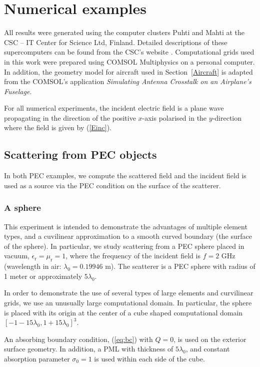 \documentclass[a4paper,12pt]{article}
\newcommand{\epsr}{\epsilon_{\mathrm{r}}}
\newcommand{\mur}{\mu_{\mathrm{r}}}
\begin{document}
\section{Numerical examples}\label{sec:NE}

All results were generated using the computer clusters Puhti and Mahti at the CSC – IT Center for Science Ltd, Finland. Detailed descriptions of these supercomputers can be found from the CSC's website \cite{CSC}. Computational grids used in this work were prepared using COMSOL Multiphysics on a personal computer. In addition, the geometry model for aircraft used in Section~\ref{Aircraft} is adapted from the COMSOL's application {\it Simulating Antenna Crosstalk on an Airplane's Fuselage}.

For all numerical experiments, the incident electric field is a plane wave propagating in the direction of the positive $x$-axis polarised in the $y$-direction where the field is given by (\ref{Einc}). 

\subsection{Scattering from PEC objects}\label{sec:PEC}

In both PEC examples, we compute the scattered field and the incident field is used as a source via the PEC condition on the surface of the scatterer.

\subsubsection{A sphere} \label{scat_sphere}

This experiment is intended to demonstrate the advantages of multiple
element types, and a cuvilinear approximation to a smooth curved
boundary (the surface of the sphere). In particular, we study
scattering from a PEC sphere placed in vacuum, $\epsr=\mur=1$, where
the frequency of the incident field is $f = 2$ GHz (wavelength in air:
$\lambda_0=0.19946$ m). The scatterer is a PEC sphere with radius of 1
meter or approximately $5\lambda_0$.

In order to demonstrate the use of several types of large elements and
curvilinear grids, we use an unusually large computational domain. In
particular, the sphere is placed with its origin at the center of a
cube shaped computational domain $[-1-15\lambda_0, 1+15\lambda_0]^3$.

An absorbing boundary condition, (\ref{eq:bc}) with $Q=0$, is used on
the exterior surface geometry. In addition, a PML with thickness of
$5\lambda_0$, and constant absorption parameter $\sigma_0=1$ is used
within each side of the cube.
\end{document}
